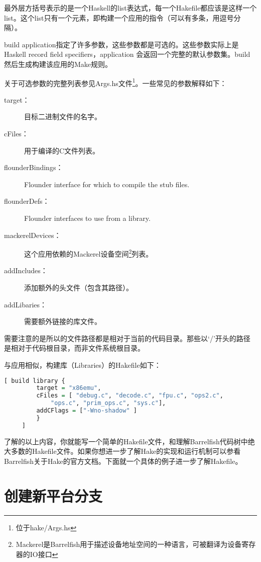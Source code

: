 \documentclass[a4paper, 12pt]{report}
\begin{document}
    最外层方括号表示的是一个Haskell的list表达式，每一个Hakefile都应该是这样一个list。这个list只有一个元素，即构建一个应用的指令（可以有多条，用逗号分隔）。
    
    build application指定了许多参数，这些参数都是可选的。这些参数实际上是Haskell record field specifiers，application 会返回一个完整的默认参数集。build然后生成构建该应用的Make规则。 
    
    关于可选参数的完整列表参见Args.hs文件\footnote{位于hake/Args.hs}。一些常见的参数解释如下：
    \begin{description}
        \item[target：] 目标二进制文件的名字。
        \item[cFiles：] 用于编译的C文件列表。
        \item[flounderBindings：] Flounder interface for which to compile the stub files.
        \item[flounderDefs：] Flounder interfaces to use from a library.
        \item[mackerelDevices：] 这个应用依赖的Mackerel设备空间\footnote{Mackerel是Barrelfish用于描述设备地址空间的一种语言，可被翻译为设备寄存器的IO接口}列表。
        \item[addIncludes：] 添加额外的头文件（包含其路径）。
        \item[addLibaries：] 需要额外链接的库文件。
     \end{description}   
     
     需要注意的是所以的文件路径都是相对于当前的代码目录。那些以‘/’开头的路径是相对于代码根目录，而非文件系统根目录。
     
     与应用相似，构建库（Libraries）的Hakefile如下：
     \begin{lstlisting}[language = Haskell]
     [ build library {
         target = "x86emu",
         cFiles = [ "debug.c", "decode.c", "fpu.c", "ops2.c",
             "ops.c", "prim_ops.c", "sys.c"],
         addCFlags = ["-Wno-shadow" ]
         }
     ]
     \end{lstlisting}
     
     了解的以上内容，你就能写一个简单的Hakefile文件，和理解Barrelfish代码树中绝大多数的Hakefile文件。如果你想进一步了解Hake的实现和运行机制可以参看Barrelfish关于Hake的官方文档。下面就一个具体的例子进一步了解Hakefile。
     
    \chapter{创建新平台分支}
    
\end{document}
